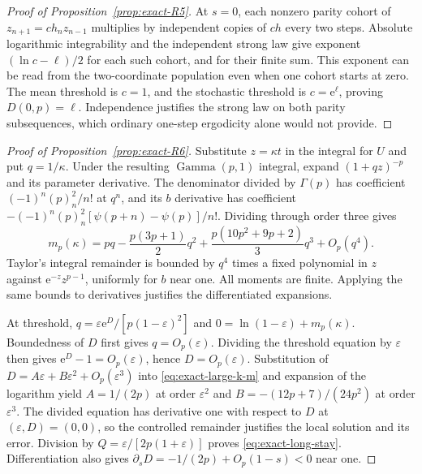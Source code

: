 \begin{proof}[Proof of Proposition~\ref{prop:exact-R5}]
At $s=0$, each nonzero parity cohort of $z_{n+1}=ch_nz_{n-1}$ multiplies by independent copies of $ch$ every two steps. Absolute logarithmic integrability and the independent strong law give exponent $(\ln c-\ell)/2$ for each such cohort, and for their finite sum. This exponent can be read from the two-coordinate population even when one cohort starts at zero. The mean threshold is $c=1$, and the stochastic threshold is $c=\mathrm{e}^{\ell}$, proving $D(0,p)=\ell$. Independence justifies the strong law on both parity subsequences, which ordinary one-step ergodicity alone would not provide.
\end{proof}

\begin{proof}[Proof of Proposition~\ref{prop:exact-R6}]
Substitute $z=\kappa t$ in the integral for $U$ and put $q=1/\kappa$. Under the resulting $\operatorname{Gamma}(p,1)$ integral, expand $(1+qz)^{-p}$ and its parameter derivative. The denominator divided by $\Gamma(p)$ has coefficient $(-1)^n(p)_n^2/n!$ at $q^n$, and its $b$ derivative has coefficient $-(-1)^n(p)_n^2[\psi(p+n)-\psi(p)]/n!$. Dividing through order three gives
\begin{equation}
 m_p(\kappa)=pq-\frac{p(3p+1)}2q^2
 +\frac{p(10p^2+9p+2)}3q^3+O_p(q^4).
 \label{eq:exact-large-k-m}
\end{equation}
Taylor's integral remainder is bounded by $q^4$ times a fixed polynomial in $z$ against $\mathrm{e}^{-z}z^{p-1}$, uniformly for $b$ near one. All moments are finite. Applying the same bounds to derivatives justifies the differentiated expansions.

At threshold, $q=\varepsilon\mathrm{e}^D/[p(1-\varepsilon)^2]$ and $0=\ln(1-\varepsilon)+m_p(\kappa)$. Boundedness of $D$ first gives $q=O_p(\varepsilon)$. Dividing the threshold equation by $\varepsilon$ then gives $\mathrm{e}^D-1=O_p(\varepsilon)$, hence $D=O_p(\varepsilon)$. Substitution of $D=A\varepsilon+B\varepsilon^2+O_p(\varepsilon^3)$ into \eqref{eq:exact-large-k-m} and expansion of the logarithm yield $A=1/(2p)$ at order $\varepsilon^2$ and $B=-(12p+7)/(24p^2)$ at order $\varepsilon^3$. The divided equation has derivative one with respect to $D$ at $(\varepsilon,D)=(0,0)$, so the controlled remainder justifies the local solution and its error. Division by $Q=\varepsilon/[2p(1+\varepsilon)]$ proves \eqref{eq:exact-long-stay}. Differentiation also gives $\partial_sD=-1/(2p)+O_p(1-s)<0$ near one.
\end{proof}

